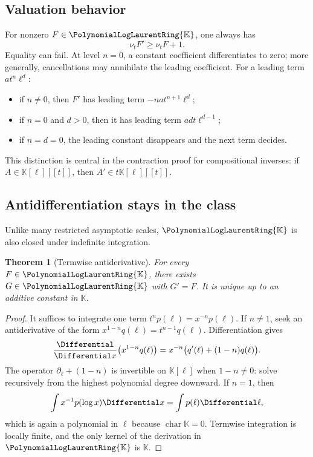 \documentclass[11pt,oneside]{article}
\numberwithin{equation}{section}
\newtheorem{theorem}{Theorem}[section]
\theoremstyle{definition}
\newcommand{\K}{\mathbb{K}}
\newcommand{\PL}{\PolynomialLogLaurentRing{\K}}
\newcommand{\ordx}{\nu_t}
\newcommand{\dlog}{\partial_{\ell}}
\begin{document}
\subsection{Valuation behavior}

For nonzero \(F\in\PL\), one always has
\[
  \ordx F'\ge\ordx F+1.
\]
Equality can fail.  At level \(n=0\), a constant coefficient differentiates to
zero; more generally, cancellations may annihilate the leading coefficient.
For a leading term \(a t^n\ell^d\):
\begin{itemize}
\item if \(n\ne0\), then \(F'\) has leading term
  \(-na t^{n+1}\ell^d\);
\item if \(n=0\) and \(d>0\), then it has leading term
  \(ad t\ell^{d-1}\);
\item if \(n=d=0\), the leading constant disappears and the next term decides.
\end{itemize}
This distinction is central in the contraction proof for compositional inverses:
if \(A\in\K[\ell][[t]]\), then \(A'\in t\K[\ell][[t]]\).

\subsection{Antidifferentiation stays in the class}

Unlike many restricted asymptotic scales, \(\PL\) is also closed under
indefinite integration.

\begin{theorem}[Termwise antiderivative]\label{thm:antiderivative}
For every \(F\in\PL\), there exists \(G\in\PL\) with \(G'=F\).  It is unique up
to an additive constant in \(\K\).
\end{theorem}

\begin{proof}
It suffices to integrate one term \(t^n p(\ell)=x^{-n}p(\ell)\).
If \(n\ne1\), seek an antiderivative of the form
\(x^{1-n}q(\ell)=t^{n-1}q(\ell)\).  Differentiation gives
\[
  \frac{\Differential}{\Differential x}\bigl(x^{1-n}q(\ell)\bigr)
  =x^{-n}\bigl(q'(\ell)+(1-n)q(\ell)\bigr).
\]
The operator \(\dlog+(1-n)\) is invertible on \(\K[\ell]\) when
\(1-n\ne0\): solve recursively from the highest polynomial degree downward.
If \(n=1\), then
\[
  \int x^{-1}p(\log x)\Differential x=\int p(\ell)\Differential\ell,
\]
which is again a polynomial in \(\ell\) because \(\operatorname{char}\K=0\).
Termwise integration is locally finite, and the only kernel of the derivation in
\(\PL\) is \(\K\).
\end{proof}
\end{document}

